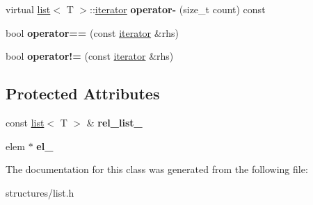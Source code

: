 \begin{DoxyCompactItemize}
\item 
\mbox{\label{classmystl_1_1list_1_1iterator_a9817fafd9a7359ebf6b4af88eb7b7ef2}} 
virtual \hyperlink{classmystl_1_1list}{list}$<$ T $>$\+::\hyperlink{classmystl_1_1list_1_1iterator}{iterator} {\bfseries operator-\/} (size\+\_\+t count) const
\item 
\mbox{\label{classmystl_1_1list_1_1iterator_aa465787465292cb5fc24dc0ba05e8673}} 
bool {\bfseries operator==} (const \hyperlink{classmystl_1_1list_1_1iterator}{iterator} \&rhs)
\item 
\mbox{\label{classmystl_1_1list_1_1iterator_a44c89f9a13a100fa447a65c7b81dc6f9}} 
bool {\bfseries operator!=} (const \hyperlink{classmystl_1_1list_1_1iterator}{iterator} \&rhs)
\end{DoxyCompactItemize}
\subsection*{Protected Attributes}
\begin{DoxyCompactItemize}
\item 
\mbox{\label{classmystl_1_1list_1_1iterator_a2cee92faef375e225891ebd363018253}} 
const \hyperlink{classmystl_1_1list}{list}$<$ T $>$ \& {\bfseries rel\+\_\+list\+\_\+}
\item 
\mbox{\label{classmystl_1_1list_1_1iterator_a5a42fd981f64eed8fa6308b466d98383}} 
elem $\ast$ {\bfseries el\+\_\+}
\end{DoxyCompactItemize}


The documentation for this class was generated from the following file\+:\begin{DoxyCompactItemize}
\item 
structures/list.\+h\end{DoxyCompactItemize}

